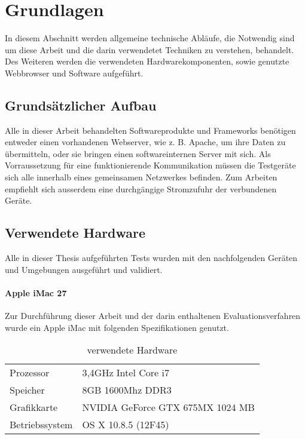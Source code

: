 \chapter{Grundlagen}
In diesem Abschnitt werden allgemeine technische Abläufe, die Notwendig sind um diese Arbeit und die darin verwendetet Techniken zu verstehen, behandelt. Des Weiteren werden die verwendeten Hardwarekomponenten, sowie genutzte \Gls{Webbrowser} und Software aufgeführt.

	\section{Grundsätzlicher Aufbau}
	Alle in dieser Arbeit behandelten Softwareprodukte und \Gls{Framework}s benötigen entweder einen vorhandenen Webserver, wie z. B. \Gls{Apache}, um ihre Daten zu übermitteln, oder sie bringen einen softwareinternen Server mit sich. Als Vorraussetzung für eine funktionierende Kommunikation müssen die Testgeräte sich alle innerhalb eines gemeinsamen Netzwerkes befinden. Zum Arbeiten empfiehlt sich ausserdem eine durchgängige Stromzufuhr der verbundenen Geräte.
	
	

	

	
	\pagebreak
	\section{Verwendete Hardware}
	Alle in dieser Thesis aufgeführten Tests wurden mit den nachfolgenden Geräten und Umgebungen ausgeführt und validiert.
	
	\subsubsection{Apple iMac 27\texttt\dq}
	Zur Durchführung dieser Arbeit und der darin enthaltenen Evaluationsverfahren wurde ein Apple iMac mit folgenden 				Spezifikationen genutzt.
	
	\begin{table}[H]
	 \vspace{-20pt}
 		\centering
			\begin{tabular}{| p{4cm} | p{8cm}  |}
			\hline
				Prozessor			&	3,4GHz Intel Core i7 \\
				Speicher			&	8GB 1600Mhz DDR3\\
				Grafikkarte		&	NVIDIA GeForce GTX 675MX 1024 MB\\
				Betriebssystem		&	OS X 10.8.5 (12F45)\\

				\hline
				\end{tabular}
			\caption{verwendete Hardware}
	\end{table}

